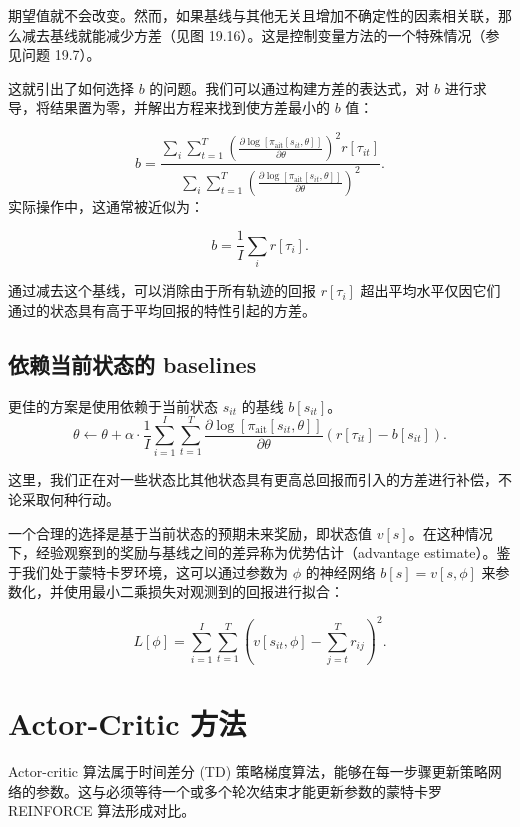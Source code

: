 \documentclass[lang=cn,newtx,10pt,scheme=chinese]{elegantbook}
\begin{document}
期望值就不会改变。然而，如果基线与其他无关且增加不确定性的因素相关联，那么减去基线就能减少方差（见图 19.16）。这是控制变量方法的一个特殊情况（参见问题 19.7）。

这就引出了如何选择 \(b\) 的问题。我们可以通过构建方差的表达式，对 \(b\) 进行求导，将结果置为零，并解出方程来找到使方差最小的 \(b\) 值：

\begin{equation}
b = \frac{\sum_{i} \sum_{t=1}^T (\frac{\partial \log[\pi_{\text{ait}}[s_{it}, \theta]]}{\partial \theta})^2 r[\tau_{it}]}{\sum_{i} \sum_{t=1}^T (\frac{\partial \log[\pi_{\text{ait}}[s_{it}, \theta]]}{\partial \theta})^2 }. 
\end{equation}
实际操作中，这通常被近似为：

\begin{equation}
b = \frac{1}{I} \sum_{i} r[\tau_{i}]. 
\end{equation}

通过减去这个基线，可以消除由于所有轨迹的回报 \(r[\tau_i]\) 超出平均水平仅因它们通过的状态具有高于平均回报的特性引起的方差。

\subsection{依赖当前状态的 baselines}
更佳的方案是使用依赖于当前状态 \(s_{it}\) 的基线 \(b[s_{it}]\)。
\begin{equation}
\theta \leftarrow \theta + \alpha \cdot \frac{1}{I} \sum_{i=1}^{I} \sum_{t=1}^{T} \frac{\partial \log[\pi_{\text{ait}}[s_{it}, \theta]]}{\partial \theta} (r[\tau_{it}] - b[s_{it}]). 
\end{equation}

这里，我们正在对一些状态比其他状态具有更高总回报而引入的方差进行补偿，不论采取何种行动。

一个合理的选择是基于当前状态的预期未来奖励，即状态值 \(v[s]\)。在这种情况下，经验观察到的奖励与基线之间的差异称为优势估计（advantage estimate）。鉴于我们处于蒙特卡罗环境，这可以通过参数为 \(\phi\) 的神经网络 \(b[s] = v[s, \phi]\) 来参数化，并使用最小二乘损失对观测到的回报进行拟合：

\begin{equation}
L[\phi] = \sum_{i=1}^{I} \sum_{t=1}^{T} \left( v[s_{it}, \phi] - \sum_{j=t}^{T} r_{ij} \right)^2. 
\end{equation}

\section{Actor-Critic 方法}
Actor-critic 算法属于时间差分 (TD) 策略梯度算法，能够在每一步骤更新策略网络的参数。这与必须等待一个或多个轮次结束才能更新参数的蒙特卡罗 REINFORCE 算法形成对比。
\end{document}
